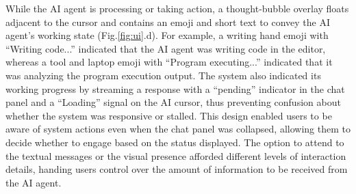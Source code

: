 While the AI agent is processing or taking action, a thought-bubble overlay floats adjacent to the cursor and contains an emoji and short text to convey the AI agent's working state (Fig.\ref{fig:ui}.d). 
For example, a writing hand emoji with ``Writing code...'' indicated that the AI agent was writing code in the editor, whereas a tool and laptop emoji with ``Program executing...'' indicated that it was analyzing the program execution output. 
The system also indicated its working progress by streaming a response with a ``pending'' indicator in the chat panel and a ``Loading'' signal on the AI cursor, thus preventing confusion about whether the system was responsive or stalled.
This design enabled users to be aware of system actions even when the chat panel was collapsed, allowing them to decide whether to engage based on the status displayed. 
The option to attend to the textual messages or the visual presence afforded different levels of interaction details, handing users control over the amount of information to be received from the AI agent.


\subsection{}

